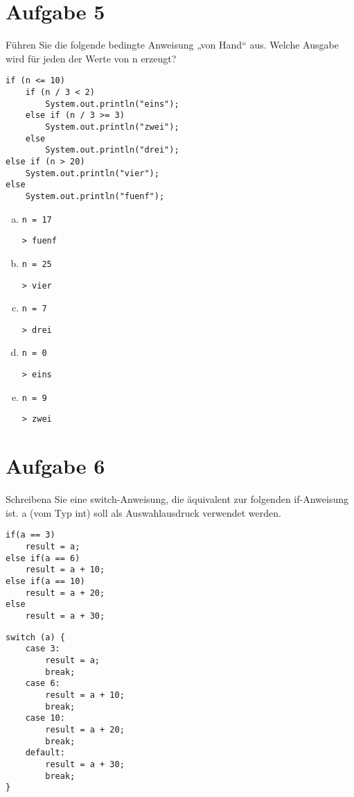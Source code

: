\documentclass[10pt, oneside]{article}
\begin{document}
\section{Aufgabe 5}

Führen Sie die folgende bedingte Anweisung „von Hand“ aus. Welche Ausgabe wird
für jeden der Werte von n erzeugt?

\begin{verbatim}
if (n <= 10)
    if (n / 3 < 2)
        System.out.println("eins");
    else if (n / 3 >= 3)
        System.out.println("zwei");
    else
        System.out.println("drei");
else if (n > 20)
    System.out.println("vier");
else
    System.out.println("fuenf");
\end{verbatim}

\begin{enumerate}[(a)]
    \item \verb|n = 17|
\begin{verbatim}
> fuenf
\end{verbatim}
    \item \verb|n = 25|
\begin{verbatim}
> vier
\end{verbatim}
    \item \verb|n = 7|
\begin{verbatim}
> drei
\end{verbatim}
    \item \verb|n = 0|
\begin{verbatim}
> eins
\end{verbatim}
    \item \verb|n = 9|
\begin{verbatim}
> zwei
\end{verbatim}
\end{enumerate}

\section{Aufgabe 6}

Schreibena Sie eine switch-Anweisung, die äquivalent zur folgenden if-Anweisung
ist. a (vom Typ int) soll als Auswahlausdruck verwendet werden.

\begin{verbatim}
if(a == 3)
    result = a;
else if(a == 6)
    result = a + 10;
else if(a == 10)
    result = a + 20;
else
    result = a + 30;
\end{verbatim}

\begin{verbatim}
switch (a) {
    case 3:
        result = a;
        break;
    case 6:
        result = a + 10;
        break;
    case 10:
        result = a + 20;
        break;
    default:
        result = a + 30;
        break;
}
\end{verbatim}
\end{document}
